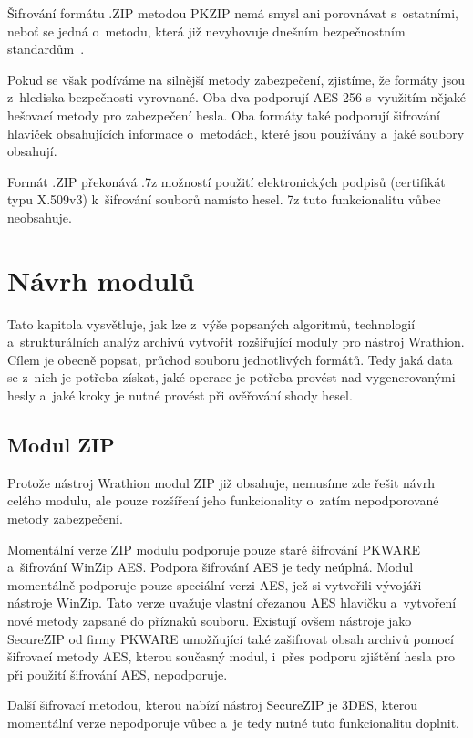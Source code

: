 Šifrování formátu .ZIP metodou PKZIP nemá smysl ani porovnávat s~ostatními, neboť se jedná
o~metodu, která již nevyhovuje dnešním bezpečnostním standardům~\cite{PKWARE:2014}. 

 Pokud se však podíváme na silnější metody zabezpečení, zjistíme, že formáty jsou z~hlediska
bezpečnosti vyrovnané. Oba dva podporují AES-256 s~využitím nějaké hešovací metody pro zabezpečení
hesla. Oba formáty také podporují šifrování hlaviček obsahujících informace o~metodách, které jsou
používány a~jaké soubory obsahují.

 Formát .ZIP překonává .7z možností použití elektronických podpisů (certifikát typu X.509v3)
k~šifrování souborů namísto hesel. 7z tuto funkcionalitu vůbec neobsahuje. 



\chapter{Návrh modulů}
\label{ch:moduly}
Tato kapitola vysvětluje, jak lze z~výše popsaných algoritmů, technologií a~strukturálních
analýz archivů vytvořit rozšiřující moduly pro nástroj Wrathion. Cílem je obecně popsat, průchod
souboru jednotlivých formátů. Tedy jaká data se z~nich je potřeba získat, jaké operace je
potřeba provést nad vygenerovanými hesly a~jaké kroky je nutné provést při ověřování shody hesel.

\section{Modul ZIP}
Protože nástroj Wrathion modul ZIP již obsahuje, nemusíme zde řešit návrh celého modulu, ale pouze
rozšíření jeho funkcionality o~zatím nepodporované metody zabezpečení.

 Momentální verze ZIP modulu podporuje pouze staré šifrování PKWARE a~šifrování WinZip AES. Podpora
šifrování AES je tedy neúplná. Modul momentálně podporuje pouze speciální verzi AES, jež si
vytvořili vývojáři nástroje WinZip. Tato verze uvažuje vlastní ořezanou AES hlavičku a~vytvoření
nové metody zapsané do příznaků souboru. Existují ovšem nástroje jako SecureZIP od firmy PKWARE umožňující také
zašifrovat obsah archivů pomocí šifrovací metody AES, kterou současný modul, i~přes podporu zjištění
hesla pro při použití šifrování AES, nepodporuje.

 Další šifrovací metodou, kterou nabízí nástroj SecureZIP je 3DES, kterou momentální verze
nepodporuje vůbec a~je tedy nutné tuto funkcionalitu doplnit.

